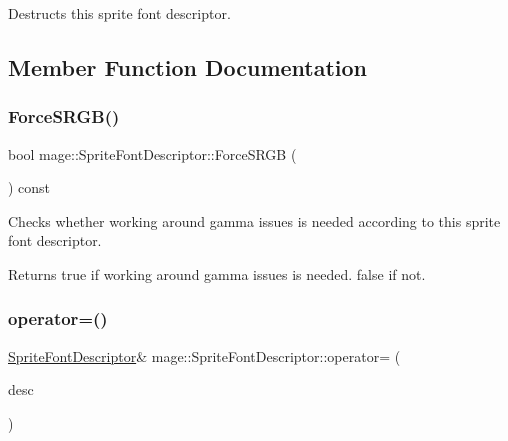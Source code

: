 Destructs this sprite font descriptor. 

\subsection{Member Function Documentation}
\hypertarget{structmage_1_1_sprite_font_descriptor_a6124a9d8323768b970033eef43d0be6f}{}\label{structmage_1_1_sprite_font_descriptor_a6124a9d8323768b970033eef43d0be6f} 
\subsubsection{\texorpdfstring{Force\+S\+R\+G\+B()}{ForceSRGB()}}
{\footnotesize\ttfamily bool mage\+::\+Sprite\+Font\+Descriptor\+::\+Force\+S\+R\+GB (\begin{DoxyParamCaption}{ }\end{DoxyParamCaption}) const\hspace{0.3cm}{\ttfamily [noexcept]}}

Checks whether working around gamma issues is needed according to this sprite font descriptor.

\begin{DoxyReturn}{Returns}
{\ttfamily true} if working around gamma issues is needed. {\ttfamily false} if not. 
\end{DoxyReturn}
\hypertarget{structmage_1_1_sprite_font_descriptor_a2279d65420bd8230a334c4ceb560fcf6}{}\label{structmage_1_1_sprite_font_descriptor_a2279d65420bd8230a334c4ceb560fcf6} 
\subsubsection{\texorpdfstring{operator=()}{operator=()}\hspace{0.1cm}{\footnotesize\ttfamily [1/2]}}
{\footnotesize\ttfamily \hyperlink{structmage_1_1_sprite_font_descriptor}{Sprite\+Font\+Descriptor}\& mage\+::\+Sprite\+Font\+Descriptor\+::operator= (\begin{DoxyParamCaption}\item[{const \hyperlink{structmage_1_1_sprite_font_descriptor}{Sprite\+Font\+Descriptor} \&}]{desc }\end{DoxyParamCaption})\hspace{0.3cm}{\ttfamily [default]}}

